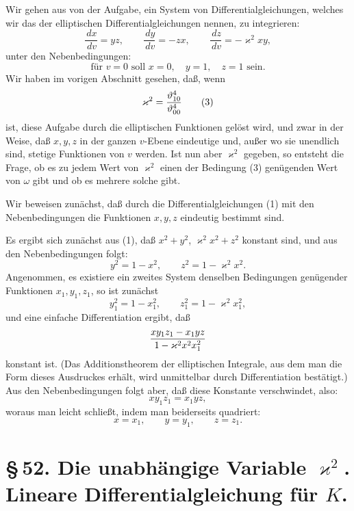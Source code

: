 \documentclass[11pt]{article}
\providecommand{\dd}{\,d}
\providecommand{\tht}{\vartheta}
\begin{document}
Wir gehen aus von der Aufgabe, ein System von Differentialgleichungen, welches wir das der elliptischen Differentialgleichungen nennen, zu integrieren:
\begin{equation}
\frac{\dd x}{\dd v}=yz,\qquad
\frac{\dd y}{\dd v}=-zx,\qquad
\frac{\dd z}{\dd v}=-\varkappa^2xy,
\tag{1}
\end{equation}
unter den Nebenbedingungen:
\begin{equation}
\text{für }v=0\text{ soll }x=0,
\quad y=1,
\quad z=1\text{ sein.}
\tag{2}
\end{equation}
Wir haben im vorigen Abschnitt gesehen, daß, wenn
\begin{equation}
\varkappa^2={\tht_{10}^4\over\tht_{00}^4}
\tag{3}
\end{equation}
ist, diese Aufgabe durch die elliptischen Funktionen gelöst wird, und zwar in der Weise, daß $x,y,z$ in der ganzen $v$-Ebene eindeutige und, außer wo sie unendlich sind, stetige Funktionen von $v$ werden. Ist nun aber $\varkappa^2$ gegeben, so entsteht die Frage, ob es zu jedem Wert von $\varkappa^2$ einen der Bedingung (3) genügenden Wert von $\omega$ gibt und ob es mehrere solche gibt.

Wir beweisen zunächst, daß durch die Differentialgleichungen (1) mit den Nebenbedingungen die Funktionen $x,y,z$ eindeutig bestimmt sind.

Es ergibt sich zunächst aus (1), daß $x^2+y^2$, $\varkappa^2x^2+z^2$ konstant sind, und aus den Nebenbedingungen folgt:
\begin{equation}
y^2=1-x^2,
\qquad
z^2=1-\varkappa^2x^2.
\tag{4}
\end{equation}
Angenommen, es existiere ein zweites System denselben Bedingungen genügender Funktionen $x_1,y_1,z_1$, so ist zunächst
\[
y_1^2=1-x_1^2,
\qquad
z_1^2=1-\varkappa^2x_1^2,
\]
und eine einfache Differentiation ergibt, daß
\[
{xy_1z_1-x_1yz\over 1-\varkappa^2x^2x_1^2}
\]
konstant ist. (Das Additionstheorem der elliptischen Integrale, aus dem man die Form dieses Ausdruckes erhält, wird unmittelbar durch Differentiation bestätigt.) Aus den Nebenbedingungen folgt aber, daß diese Konstante verschwindet, also:
\[
xy_1z_1=x_1yz,
\]
woraus man leicht schließt, indem man beiderseits quadriert:
\[
x=x_1,
\qquad y=y_1,
\qquad z=z_1.
\]

\section*{\S\,52. Die unabhängige Variable $\varkappa^2$. Lineare Differentialgleichung für $K$.}
\end{document}
